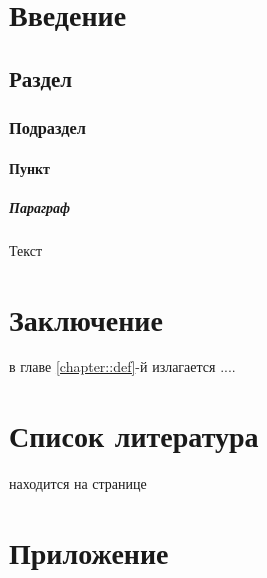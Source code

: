 \documentclass[a4paper,12pt]{report}
\begin{document}
\chapter{Введение}

\section{Раздел}

\subsection{Подраздел}\label{subsection::p1}

\subsubsection{Пункт}

\paragraph{Параграф} Текст


\chapter{Заключение}

в главе \ref{chapter::def}-й излагается ....

\chapter{Список литература} %

находится на странице \pageref{chapter::def}

\chapter{Приложение}
\end{document}
